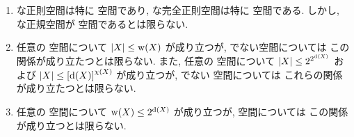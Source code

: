 \documentclass[uplatex, dvipdfmx, a4paper, 12pt, class=jsarticle, crop=false]{standalone}
\begin{document}
\renewcommand{\labelenumi}{(\alph{enumi})}
\begin{problem}[1.5.D]\label{eng-1-5-D-problem}
	\begin{enumerate}
		\item {} な正則空間は特に  空間であり,
		 な完全正則空間は特に  空間である.
		しかし,  な正規空間が  空間であるとは限らない.
		\item 任意の  空間について
		\( \cardinality{X} \leq \topweight{X} \)
		が成り立つが,  でない空間については
		この関係が成り立たつとは限らない.
		また, 任意の  空間について
		\( \cardinality{X} \leq 2^{2^{\topdensity{X}}} \)
		および
		\( \cardinality{X} \leq \lrbrack{\topdensity{X}}^{\topcharacter{X}} \)
		が成り立つが,  でない  空間については
		これらの関係が成り立たつとは限らない.
		\item 任意の  空間について
		\( \topweight{X} \leq 2^{\topdensity{X}} \)
		が成り立つが,  空間については
		この関係が成り立つとは限らない.
	\end{enumerate}
\end{problem}
\end{document}
